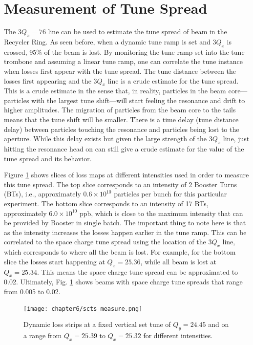 \section{Measurement of Tune Spread}

The $3Q_x=76$ line can be used to estimate the tune spread of beam in the Recycler Ring. As seen before, when a dynamic tune ramp is set and $3Q_x$ is crossed, 95\% of the beam is lost. By monitoring the tune ramp set into the tune trombone and assuming a linear tune ramp, one can correlate the tune instance when losses first appear with the tune spread. The tune distance between the losses first appearing and the $3Q_x$ line is a crude estimate for the tune spread. This is a crude estimate in the sense that, in reality, particles in the beam core---particles with the largest tune shift---will start feeling the resonance and drift to higher amplitudes. The migration of particles from the beam core to the tails means that the tune shift will be smaller. There is a time delay (tune distance delay) between particles touching the resonance and particles being lost to the aperture. While this delay exists but given the large strength of the $3Q_x$ line, just hitting the resonance head on can still give a crude estimate for the value of the tune spread and its behavior.

Figure \ref{fig:dynamictunespread} shows slices of loss maps at different intensities used in order to measure this tune spread. The top slice corresponds to an intensity of 2 Booster Turns (BTs), i.e., approximately $0.6\times10^{10}$ particles per bunch for this particular experiment. The bottom slice corresponds to an intensity of 17 BTs, approximately $6.0\times10^{10}$ ppb, which is close to the maximum intensity that can be provided by Booster in single batch. The important thing to note here is that as the intensity increases the losses happen earlier in the tune ramp. This can be correlated to the space charge tune spread using the location of the $3Q_x$ line, which corresponds to where all the beam is lost. For example, for the bottom slice the losses start happening at $Q_x=25.36$, while all beam is lost at $Q_x=25.34$. This means the space charge tune spread can be approximated to 0.02. Ultimately, Fig. \ref{fig:dynamictunespread} shows beams with space charge tune spreads that range from 0.005 to 0.02.

\newpage
\begin{figure}[H]
    \centering
    \texttt{[image: chapter6/scts\_measure.png]}
    \caption{Dynamic loss strips at a fixed vertical set tune of $Q_y=24.45$ and on a range from $Q_x=25.39$ to $Q_x=25.32$ for different intensities.}
    \label{fig:dynamictunespread}
\end{figure}
\newpage

